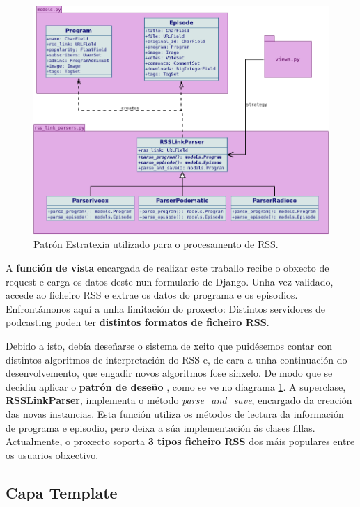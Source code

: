 \begin{figure}[h]
	\centering
	\includegraphics[scale=0.45,keepaspectratio=true]{./images/strategy.png}
	\caption{Patrón Estratexia utilizado para o procesamento de RSS.}
	\label{fig:strategy}
\end{figure}

A \textbf{función de vista} encargada de realizar este traballo recibe o obxecto de request e carga os datos deste nun formulario de Django. Unha vez validado, accede ao ficheiro RSS e extrae os datos do programa e os episodios. Enfrontámonos aquí a unha limitación do proxecto: Distintos servidores de podcasting poden ter \textbf{distintos formatos de ficheiro RSS}.

Debido a isto, debía deseñarse o sistema de xeito que puidésemos contar con distintos algoritmos de interpretación do RSS e, de cara a unha continuación do desenvolvemento, que engadir novos algoritmos fose sinxelo. De modo que se decidiu aplicar o \textbf{patrón de deseño }, como se ve no diagrama \ref{fig:strategy}. A superclase, \textbf{RSSLinkParser}, implementa o método \textit{parse\_and\_save}, encargado da creación das novas instancias. Esta función utiliza os métodos de lectura da información de programa e episodio, pero deixa a súa implementación ás clases fillas. Actualmente, o proxecto soporta \textbf{3 tipos ficheiro RSS} dos máis populares entre os usuarios obxectivo.


\subsection{Capa Template}
\label{capa_template}


